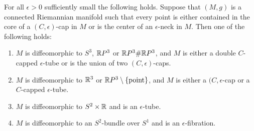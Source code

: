 \begin{proposition}
\label{prop:classification-covered-by-necks-caps}
\label{epstopology}

For all $\epsilon>0$ sufficiently small the following holds. Suppose
that $(M,g)$ is a connected Riemannian manifold such that every
point is either contained in the core of a $(C,\epsilon)$-cap in $M$
or is the center of an $\epsilon$-neck in $M$. Then one of the
following holds:
\begin{enumerate}
\item[(1)] $M$ is diffeomorphic to $S^3$, $\mathbb{R} P^3$ or $\mathbb{R} P^3\#\mathbb{R}
P^3$,
and $M$ is either a double $C$-capped $\epsilon$-tube or is the
union of two $(C,\epsilon)$-caps.
\item[(2)] $M$ is diffeomorphic to  $\mathbb{R}^3$ or $\mathbb{R} P^3\setminus \{\mathrm{point}\}$,
and $M$ is either a $(C,\epsilon$-cap or a $C$-capped
$\epsilon$-tube.
\item[(3)] $M$ is diffeomorphic to $S^2\times \mathbb{R}$ and is an
$\epsilon$-tube.
\item[(4)] $M$ is diffeomorphic to an $S^2$-bundle over $S^1$ and is an $\epsilon$-fibration.
\end{enumerate}
\end{proposition}
